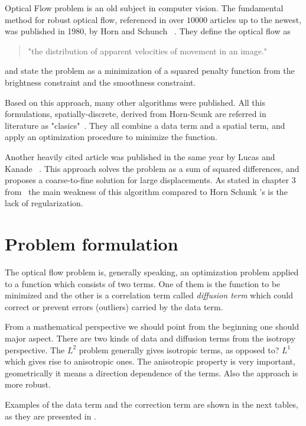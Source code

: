 \documentclass[12pt,a4paper,twoside]{report}
\begin{document}
Optical Flow problem is an old subject in computer vision. The fundamental method for robust optical flow, referenced in over $10000$ articles up to the newest, was published in 1980, by Horn and Schunch ~\cite{HSOpticalFlow}. They define the optical flow as
\begin{quote}
"the distribution of apparent velocities of movement in an image."
\end{quote}
and state the problem as a minimization of a squared penalty function from the brightness constraint and the smoothness constraint.

Based on this approach, many other algorithms were published. All this formulations, spatially-discrete, derived from Horn-Scunk are referred in literature as "clasics"~\cite{sun2010,QAnalysis}. They all combine a data term and a spatial term, and apply an optimization procedure to minimize the function. 

Another heavily cited article was published in the same year by Lucas and Kanade ~\cite{lucas1981}. This approach solves the problem as a sum of squared differences, and proposes a coarse-to-fine solution for large displacements. As stated in chapter 3 from~\cite{mitiche2014computer} the main weakness of this algorithm compared to Horn Schunk 's is the lack of regularization.
 
\section{Problem formulation}
The optical flow problem is, generally speaking, an optimization problem applied to a function which consists of two terms. One of them is the function to be minimized and the other is a correlation term called \textit{diffusion term} which could correct or prevent errors (outliers) carried by the data term. 

From a mathematical perspective we should point from the beginning one should major aspect. There are two kinds of data and diffusion terms from the isotropy perspective. The $L^2$ problem generally gives isotropic terms, as opposed to? $L^1$ which gives rise to anisotropic ones. The anisotropic property is very important, geometrically it means a direction dependence of the terms. Also the approach is more robust.

Examples of the data term and the correction term are shown in the next tables,  as they are presented in \cite{trobin}.
\end{document}
